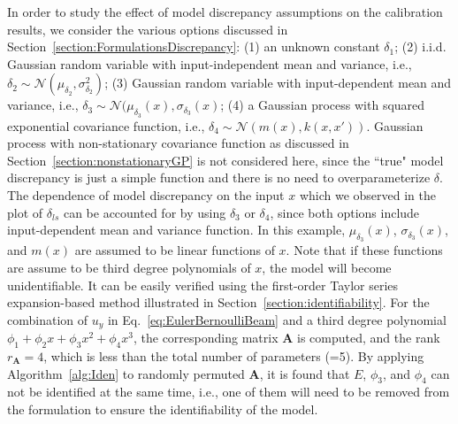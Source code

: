 \documentclass[preprint,review,12pt,3p]{elsarticle}
\begin{document}
In order to study the effect of model discrepancy assumptions on the calibration results, we consider the various options discussed in Section~\ref{section:FormulationsDiscrepancy}: (1) an unknown constant $\delta_1$; (2) i.i.d. Gaussian random variable with input-independent mean and variance, i.e., $\delta_2 \sim \mathcal{N}(\mu_{\delta_2},\sigma_{\delta_2}^2)$; (3) Gaussian random variable with input-dependent mean and variance, i.e., $\delta_3 \sim \mathcal{N}(\mu_{\delta_3}(x),\sigma_{\delta_3}(x)$; (4) a Gaussian process with squared exponential covariance function, i.e., $\delta_4 \sim \mathcal{N}(m(x), k(x,x'))$. Gaussian process with non-stationary covariance function as discussed in Section~\ref{section:nonstationaryGP} is not considered here, since the ``true" model discrepancy is just a simple function and there is no need to overparameterize $\delta$. The dependence of model discrepancy on the input $x$ which we observed in the plot of $\delta_{ls}$ can be accounted for by using $\delta_3$ or $\delta_4$, since both options include input-dependent mean and variance function. In this example, $\mu_{\delta_3}(x)$, $\sigma_{\delta_3}(x)$, and $m(x)$ are assumed to be linear functions of $x$. Note that if these functions are assume to be third degree polynomials of $x$, the model will become unidentifiable.  It can be easily verified using the first-order Taylor series expansion-based method illustrated in Section~\ref{section:identifiability}. For the combination of $u_y$ in Eq.~\ref{eq:EulerBernoulliBeam} and a third degree polynomial $\phi_1+\phi_2 x + \phi_3 x^2 + \phi_4 x^3$, the corresponding matrix $\boldsymbol{A}$  is computed, and the rank $r_{\boldsymbol{A}}=4$, which is less than the total number of parameters (=5). By applying Algorithm~\ref{alg:Iden} to randomly permuted $\boldsymbol{A}$, it is found that $E$, $\phi_3$, and $\phi_4$ can not be identified at the same time, i.e., one of them will need to be removed from the formulation to ensure the identifiability of the model. 
\end{document}
